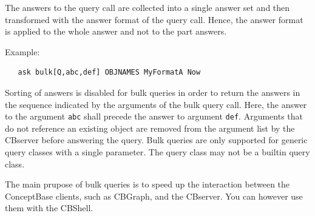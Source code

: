The answers to the query call are collected into a single answer set and then transformed with
the answer format of the query call. Hence, the answer format is applied to the whole answer
and not to the part answers.

Example:

{\small
\begin{verbatim}
   ask bulk[Q,abc,def] OBJNAMES MyFormatA Now
\end{verbatim}
}

Sorting of answers is disabled for bulk queries in order to return the answers in the sequence
indicated by the arguments of the bulk query call. Here, the answer to the argument {\tt abc}
shall precede the answer to argument {\tt def}. Arguments that do not reference an existing
object are removed from the argument list by the CBserver before answering the query.
Bulk queries are only supported for generic query classes with a single parameter.
The query class may not be a builtin query class.

The main prupose of bulk queries is to speed up the interaction between the ConceptBase clients,
such as CBGraph, and the CBserver. You can however use them with the CBShell.


